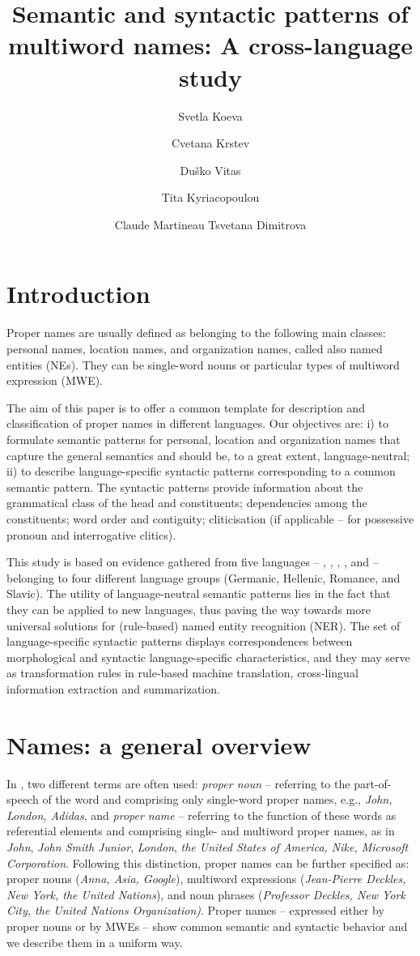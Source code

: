 \documentclass[output=paper]{langsci/langscibook}
\author{Svetla Koeva\affiliation{Institute for Bulgarian Language, Bulgarian Academy of Sciences}%
\and Cvetana Krstev\affiliation{Faculty of Philology, University of Belgrade}%
\and Duško Vitas\affiliation{Faculty of Mathematics, University of Belgrade}%
\and Tita Kyriacopoulou\affiliation{Université Paris-Est Marne-la-Vallée}%
\and Claude Martineau\affiliation{LIGM, Universite Paris-Est Marne-la-Vallée}%
\lastand Tsvetana Dimitrova\affiliation{Institute for Bulgarian Language, Bulgarian Academy of Sciences}}
\title{Semantic and syntactic patterns of multiword names: A cross-language study}
\begin{document}
\section{Introduction}

Proper names are usually defined as belonging to the following main
classes:   personal names,  location names, and  organization names, called
also  named entities (NEs). They can be single-word nouns or particular
types of multiword expression (MWE).

The aim of this paper is to offer a common template for description and
classification of proper names in different languages. Our objectives
are: i) to formulate semantic patterns for personal, location and
organization names that capture the general semantics and should be, to
a great extent, language-neutral; ii) to describe language-specific
syntactic patterns corresponding to a common semantic pattern. The
syntactic patterns provide information about the grammatical class of
the head and constituents; dependencies among the constituents; word
order and contiguity; cliticisation (if applicable – for possessive
pronoun and interrogative clitics).

This study is based on evidence gathered from five languages – , , , , and  –
belonging to four different language groups (Germanic, Hellenic,
Romance, and Slavic). The utility of language-neutral semantic patterns
lies in the fact that they can be applied to new languages, thus paving
the way towards more universal solutions for (rule-based) named entity
recognition (NER). The set of language-specific syntactic patterns
displays correspondences between morphological and syntactic
language-specific characteristics, and they may serve as transformation
rules in rule-based machine translation, cross-lingual information
extraction and summarization.


\section{Names: a general overview}


In  \citep[96]{huddleston1988}, two different terms are often used:
\textit{proper noun} – referring to the part-of-speech of the word and
comprising only single-word proper names, e.g., \textit{John, London,
Adidas}, and \textit{proper name} – referring to the function of these words
as referential elements and comprising single- and multiword proper
names, as in \textit{John}, \textit{John Smith Junior},
\textit{London}, \textit{the United States of America, Nike, Microsoft
Corporation}. Following this distinction, proper names can be further
specified as: proper nouns (\textit{Anna, Asia, Google}), multiword
expressions (\textit{Jean-Pierre Deckles, New York, the United
Nations}), and noun phrases (\textit{Professor Deckles, New York City,
the United Nations Organization)}. Proper names – expressed either by
proper nouns or by MWEs – show common semantic and syntactic behavior
and we describe them in a uniform way.
\end{document}
